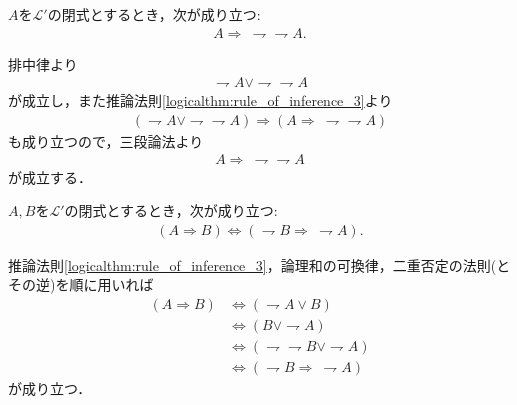 	\begin{screen}
		\begin{logicalthm}[二重否定の法則の逆が成り立つ]
			$A$を$\mathcal{L}'$の閉式とするとき，次が成り立つ:
			\begin{align}
				A \Longrightarrow\ \rightharpoondown \rightharpoondown A.
			\end{align}
		\end{logicalthm}
	\end{screen}
	
	\begin{prf}
		排中律より
		\begin{align}
			\rightharpoondown A \vee \rightharpoondown \rightharpoondown A
		\end{align}
		が成立し，また推論法則\ref{logicalthm:rule_of_inference_3}より
		\begin{align}
			(\rightharpoondown A \vee \rightharpoondown \rightharpoondown A)
			\Longrightarrow (A \Longrightarrow\ \rightharpoondown \rightharpoondown A)
		\end{align}
		も成り立つので，三段論法より
		\begin{align}
			A \Longrightarrow\ \rightharpoondown \rightharpoondown A
		\end{align}
		が成立する．
		\QED
	\end{prf}
	
	\begin{screen}
		\begin{logicalthm}[対偶命題は同値]\label{thm:contraposition_is_true}
			$A,B$を$\mathcal{L}'$の閉式とするとき，次が成り立つ:
			\begin{align}
				(A \Longrightarrow B) \Longleftrightarrow (\rightharpoondown B \Longrightarrow\ \rightharpoondown A).
			\end{align}
		\end{logicalthm}
	\end{screen}
	
	\begin{prf}
		推論法則\ref{logicalthm:rule_of_inference_3}，論理和の可換律，二重否定の法則(とその逆)を順に用いれば
		\begin{align}
			(A \Longrightarrow B) &\Longleftrightarrow (\rightharpoondown A \vee B) \\
			&\Longleftrightarrow (B \vee \rightharpoondown A) \\
			&\Longleftrightarrow (\rightharpoondown \rightharpoondown B \vee \rightharpoondown A) \\
			&\Longleftrightarrow (\rightharpoondown B \Longrightarrow\ \rightharpoondown A)
		\end{align}
		が成り立つ．
		\QED
	\end{prf}
	
